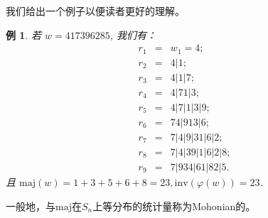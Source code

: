 \documentclass[a4paper,11pt]{article}
\newtheorem{exa}[thm]{例}
\def \maj{\mathrm{maj}}
\def \inv{\mathrm{inv}}
\begin{document}
我们给出一个例子以便读者更好的理解。

\begin{exa}
	若 $w=417396285$, 我们有：
	\begin{eqnarray*}
		r_1  &=& w_1=4;\\
		r_2  &=& 4|1;\\
		r_3  &=& 4|1|7;\\
		r_4  &=& 4|71|3;\\
		r_5  &=& 4|7|1|3|9;\\
		r_6  &=& 74|913|6;\\
		r_7  &=& 7|4|9|31|6|2;\\
		r_8  &=& 7|4|39|1|6|2|8;\\
		r_9  &=& 7|934|61|82|5.
	\end{eqnarray*}
	且 $\maj(w)=1+3+5+6+8=23, \inv(\varphi(w))=23$.
\end{exa}

一般地，与$\mathrm{maj}$在$S_n$上等分布的统计量称为Mohonian的。
\end{document}
